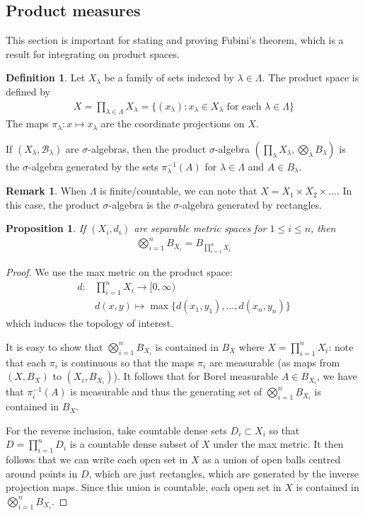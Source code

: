 \documentclass[11pt]{amsart}
\newtheorem{proposition}[theorem]{Proposition}
\theoremstyle{definition}
\newtheorem{definition}[theorem]{Definition}
\newtheorem{remark}[theorem]{Remark}
\numberwithin{equation}{section}
\begin{document}
\subsection{Product measures}
This section is important for stating and proving Fubini's theorem, which is a result for integrating on product spaces.
\begin{definition}
    Let $X_\lambda$ be a family of sets indexed by $\lambda\in \Lambda$. The product space is defined by
    \begin{align*}
        X=\prod_{\lambda\in\Lambda}X_{\lambda}=\{(x_\lambda):x_\lambda\in X_{\lambda}\text{ for each }\lambda\in\Lambda\}
    \end{align*}
    The maps $\pi_\lambda:x\mapsto x_\lambda$ are the coordinate projections on $X$.

    If $(X_\lambda,\mathcal B_\lambda)$ are $\sigma$-algebras, then the product $\sigma$-algebra $(\prod_\lambda X_\lambda,\bigotimes_\lambda B_\lambda)$ is the $\sigma$-algebra generated by the sets $\pi_\lambda^{-1}(A)$ for $\lambda\in\Lambda$ and $A\in B_\lambda$.
\end{definition}
\begin{remark}
    When $\Lambda$ is finite/countable, we can note that $X=X_1\times X_2\times\ldots$. In this case, the product $\sigma$-algebra is the $\sigma$-algebra generated by rectangles.
\end{remark}
\begin{proposition}
    If $(X_i,d_i)$ are separable metric spaces for $1\le i\le n$, then
    \begin{align*}
        \bigotimes_{i=1}^nB_{X_i}=B_{\prod_{i=1}^nX_i}
    \end{align*}
\end{proposition}
\begin{proof}
    We use the max metric on the product space:
    \begin{align*}
        d:&\prod_{i=1}^nX_i\to[0,\infty)\\
        &d(x,y)\mapsto\max\{d(x_1,y_1),\ldots,d(x_n,y_n)\}
    \end{align*}
    which induces the topology of interest. 

    It is easy to show that $\bigotimes_{i=1}^nB_{X_i}$ is contained in $B_X$ where $X=\prod_{i=1}^nX_i$: note that each $\pi_i$ is continuous so that the maps $\pi_i$ are measurable (as maps from $(X,B_X)$ to $(X_i,B_{X_i})$). It follows that for Borel measurable $A\in B_{X_i}$, we have that $\pi_i^{-1}(A)$ is measurable and thus the generating set of $\bigotimes_{i=1}^nB_{X_i}$ is contained in $B_X$.

    For the reverse inclusion, take countable dense sets $D_i\subset X_i$ so that $D=\prod_{i=1}^nD_i$ is a countable dense subset of $X$ under the max metric. It then follows that we can write each open set in $X$ as a union of open balls centred around points in $D$, which are just rectangles, which are generated by the inverse projection maps. Since this union is countable, each open set in $X$ is contained in $\bigotimes_{i=1}^nB_{X_i}$.
\end{proof}
\end{document}
